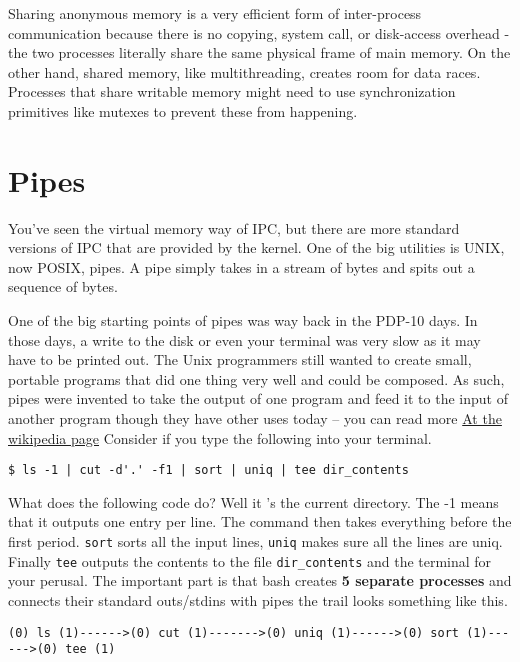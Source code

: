 Sharing anonymous memory is a very efficient form of inter-process communication because there is no copying, system call, or disk-access overhead - the two processes literally share the same physical frame of main memory.
On the other hand, shared memory, like multithreading, creates room for data races.
Processes that share writable memory might need to use synchronization primitives like mutexes to prevent these from happening.

\section{Pipes}

You've seen the virtual memory way of IPC, but there are more standard versions of IPC that are provided by the kernel.
One of the big utilities is UNIX, now POSIX, pipes. A pipe simply takes in a stream of bytes and spits out a sequence of bytes.

One of the big starting points of pipes was way back in the PDP-10 days. In those days, a write to the disk or even your terminal was very slow as it may have to be printed out.
The Unix programmers still wanted to create small, portable programs that did one thing very well and could be composed.
As such, pipes were invented to take the output of one program
and feed it to the input of another program though they have other uses today -- you can read more \href{https://en.wikipedia.org/wiki/Pipeline\_\%28Unix\%29}{At the wikipedia page}
Consider if you type the following into your terminal.

\begin{verbatim}
$ ls -1 | cut -d'.' -f1 | sort | uniq | tee dir_contents
\end{verbatim}

What does the following code do? Well it 's the current directory.
The -1 means that it outputs one entry per line.
The  command then takes everything before the first period.
\texttt{sort} sorts all the input lines, \texttt{uniq} makes sure all the lines are uniq.
Finally \texttt{tee} outputs the contents to the file \texttt{dir\_contents} and the terminal for your perusal.
The important part is that bash creates \textbf{5 separate processes} and connects their standard outs/stdins with pipes the trail looks something like this.

\begin{verbatim}
(0) ls (1)------>(0) cut (1)------->(0) uniq (1)------>(0) sort (1)------>(0) tee (1)
\end{verbatim}

